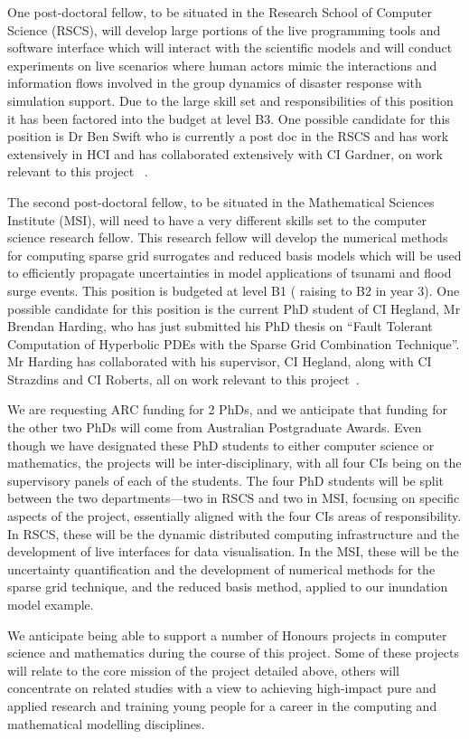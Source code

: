 One post-doctoral fellow, to be situated in the
Research School of Computer Science (RSCS), will develop large
portions of the live programming tools and software interface which
will interact with the scientific models and will conduct experiments
on live scenarios where human actors mimic the interactions and
information flows involved in the group dynamics of disaster response
with simulation support. Due to the large skill set and responsibilities of 
this position it has been factored into the budget at level B3.
One possible candidate for this position is 
Dr Ben Swift who is currently a post doc in the RSCS and has work 
extensively in HCI and has collaborated extensively with CI Gardner, on work 
relevant to this project ~\parencite{martin2015tracking,martin2016intelligent,swiftLive2016,
swift2013visual,swift2014coding}.

The second post-doctoral fellow, to be
situated in the Mathematical Sciences Institute (MSI), 
will need to have a very different skills set to the computer 
science research fellow. This research fellow will develop
the numerical methods for computing sparse grid surrogates and reduced
basis models which will be used to efficiently propagate 
uncertainties in
model applications of tsunami and flood surge events. This 
position is budgeted at level B1 ( raising to B2 in year 3).
One possible candidate for this position is the current PhD 
student of CI Hegland, Mr Brendan Harding,  who has just 
submitted his PhD thesis on ``Fault Tolerant Computation of
Hyperbolic PDEs with the Sparse Grid Combination Technique''.
Mr Harding has collaborated with his supervisor, 
CI Hegland, along with CI Strazdins and CI Roberts, all
on work relevant to this project~\parencite{Ali11022016,AliEtal2015,deBaarHarding2015,
HardingHLS2015,StrazdinsEtal2015}.


We are requesting ARC funding for 2 PhDs, and we anticipate that funding for the other two PhDs will come 
from  Australian Postgraduate Awards.  Even though we have designated these 
PhD students to either computer science or mathematics, the 
projects will be inter-disciplinary, with all four CIs being on the supervisory panels of 
each of the students. The four PhD students will be split between the two departments---two
in RSCS and two in MSI, focusing on specific aspects of the project,
essentially aligned with the four CIs areas of responsibility.  In
RSCS, these will be the dynamic distributed computing infrastructure
and the development of live interfaces for data visualisation. In the
MSI, these will be the uncertainty quantification and the development
of numerical methods for the sparse grid technique, and the reduced
basis method, applied to our inundation model example.


We anticipate being able to support a number of Honours projects in
computer science and mathematics during the course of this
project. Some of these projects will relate to the core mission of the
project detailed above, others will concentrate on related studies
with a view to achieving high-impact pure and applied research and
training young people for a career in the computing and mathematical
modelling disciplines.

